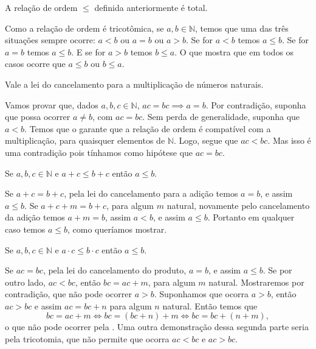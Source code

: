 \documentclass[../main.tex]{subfiles}
\begin{document}
\begin{corol}\label{nat-corol-total}
    A relação de ordem $\leq$ definida anteriormente é total.
\end{corol}
\begin{dem}
    Como a relação de ordem é tricotômica, se $a,b \in \mathbb{N}$, temos que uma das três situações sempre ocorre:
    $a < b \text{ ou } a=b \text{ ou } a > b$. Se for $a < b$ temos $a \leq b$. Se for $a = b$ temos $a \leq b$. E se for $a > b$ temos $b \leq a$. O que mostra que em todos os casos ocorre que $a \leq b$ ou $b \leq a$.
\end{dem}

\begin{corol}
    Vale a lei do cancelamento para a multiplicação de números naturais.
\end{corol}
\begin{dem}
    Vamos provar que, dados $a,b,c \in \mathbb{N}$, $ac = bc \implies a=b$. Por contradição, suponha que possa ocorrer $a \neq b$, com $ac = bc$.
    Sem perda de generalidade, suponha que $a < b$. Temos que o  garante que a relação de ordem é compatível com a multiplicação, para quaisquer elementos de $\mathbb{N}$. Logo, segue que $ac < bc$. Mas isso é uma contradição pois tínhamos como hipótese que $ac=bc$.
\end{dem}

\begin{prop}
    Se $a,b,c \in \mathbb{N}$ e $a + c \leq b + c$ então $a \leq b$.
\end{prop}
\begin{dem}
    Se $a + c = b + c$, pela lei do cancelamento para a adição temos $a=b $, e assim $ a \leq b$.
    Se $a + c + m = b + c$, para algum $m$ natural, novamente pelo cancelamento da adição temos $a+m = b$, assim $a < b $, e assim $a \leq b$. Portanto em qualquer caso temos $a \leq b$, como queríamos mostrar.
\end{dem}
\begin{prop}
    Se $a,b,c \in \mathbb{N}$ e $a \cdot c \leq b \cdot c$ então $a \leq b$.
\end{prop}
\begin{dem}
    Se $ac = bc$, pela lei do cancelamento do produto, $a=b $, e assim $ a \leq b$.
    Se por outro lado, $ac < bc$, então $bc = ac + m$, para algum $m$ natural. Mostraremos por contradição, que não pode ocorrer $a > b$.
    Suponhamos que ocorra $a > b$, então $ac > bc$ e assim $ac = bc + n$ para algum $n$ natural. Então temos que 
    \[ bc = ac + m \iff bc = (bc + n) + m \iff bc = bc + (n + m), \] 
    o que não pode ocorrer pela . Uma outra demonstração dessa segunda parte seria pela tricotomia, que não permite que ocorra $ac < bc $ e $ac > bc$.
\end{dem}
\end{document}
